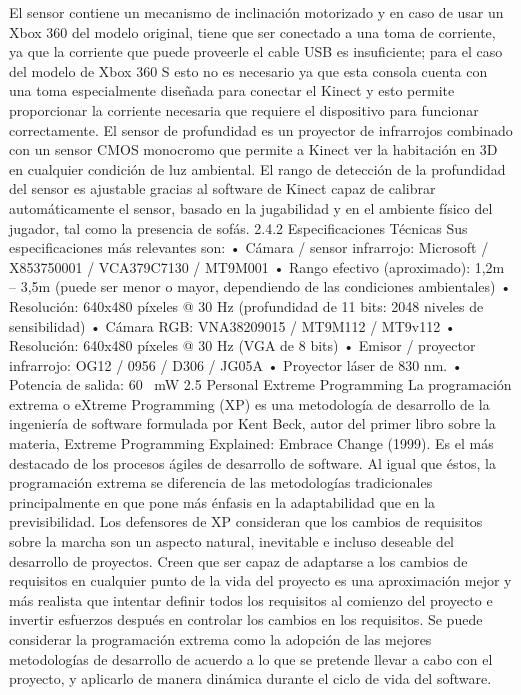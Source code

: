 El sensor contiene un mecanismo de inclinación motorizado y en caso de usar un Xbox 360 del modelo original, tiene que ser conectado a una toma de corriente, ya que la corriente que puede proveerle el cable USB es insuficiente; para el caso del modelo de Xbox 360 S esto no es necesario ya que esta consola cuenta con una toma especialmente diseñada para conectar el Kinect y esto permite proporcionar la corriente necesaria que requiere el dispositivo para funcionar correctamente.
El sensor de profundidad es un proyector de infrarrojos combinado con un sensor CMOS monocromo que permite a Kinect ver la habitación en 3D en cualquier condición de luz ambiental. El rango de detección de la profundidad del sensor es ajustable gracias al software de Kinect capaz de calibrar automáticamente el sensor, basado en la jugabilidad y en el ambiente físico del jugador, tal como la presencia de sofás.
2.4.2	Especificaciones Técnicas
Sus especificaciones más relevantes son:
•	Cámara / sensor infrarrojo: Microsoft / X853750001 / VCA379C7130 / MT9M001
•	Rango efectivo (aproximado): 1,2m – 3,5m (puede ser menor o mayor, dependiendo de las condiciones ambientales)
•	Resolución: 640x480 píxeles @ 30 Hz (profundidad de 11 bits: 2048 niveles de sensibilidad)
•	Cámara RGB: VNA38209015 / MT9M112 / MT9v112
•	Resolución: 640x480 píxeles @ 30 Hz (VGA de 8 bits)
•	Emisor / proyector infrarrojo: OG12 / 0956 / D306 / JG05A
•	Proyector láser de 830 nm.
•	Potencia de salida: 60~ mW
2.5	Personal Extreme Programming
La programación extrema o eXtreme Programming (XP) es una metodología de desarrollo de la ingeniería de software formulada por Kent Beck, autor del primer libro sobre la materia, Extreme Programming Explained: Embrace Change (1999). Es el más destacado de los procesos ágiles de desarrollo de software. Al igual que éstos, la programación extrema se diferencia de las metodologías tradicionales principalmente en que pone más énfasis en la adaptabilidad que en la previsibilidad. Los defensores de XP consideran que los cambios de requisitos sobre la marcha son un aspecto natural, inevitable e incluso deseable del desarrollo de proyectos. Creen que ser capaz de adaptarse a los cambios de requisitos en cualquier punto de la vida del proyecto es una aproximación mejor y más realista que intentar definir todos los requisitos al comienzo del proyecto e invertir esfuerzos después en controlar los cambios en los requisitos.
Se puede considerar la programación extrema como la adopción de las mejores metodologías de desarrollo de acuerdo a lo que se pretende llevar a cabo con el proyecto, y aplicarlo de manera dinámica durante el ciclo de vida del software.
